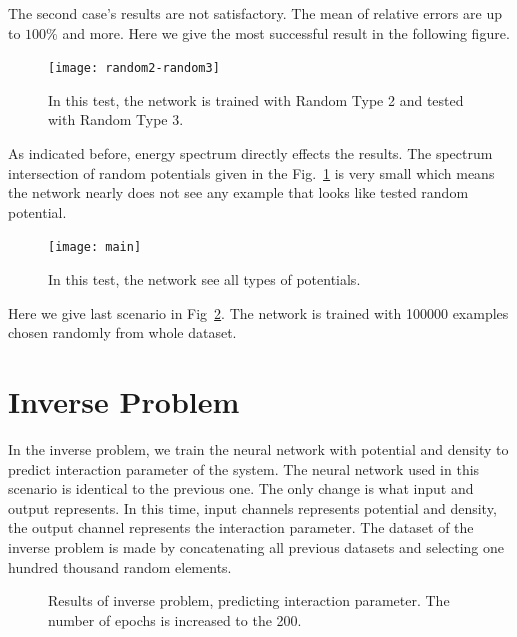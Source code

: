 \documentclass[a4paper,times,hidelinks,12pt]{article}
\begin{document}
The second case's results are not satisfactory. The mean of relative errors are up to $100\%$ and more. Here we give the most successful result in the following figure. 

\graphicspath{{"../figs/training/cross-training/"}}
\begin{figure}[H]
    \centering
    \texttt{[image: random2-random3]}
\caption{In this test, the network is trained with Random Type 2 and tested with Random Type 3.}
\label{fig:cross_training_results}
\end{figure}

As indicated before, energy spectrum directly effects the results. The spectrum intersection of random potentials given in the Fig.~\ref{fig:cross_training_results} is very small which means the network nearly does not see any example that looks like tested random potential.


\graphicspath{{"../figs/training/combined/"}}
\begin{figure}[H]
    \centering
    \texttt{[image: main]}
\caption{In this test, the network see all types of potentials.}
\label{fig:comb_training_results}
\end{figure}

Here we give last scenario in Fig~\ref{fig:comb_training_results}. The network is trained with 100000 examples chosen randomly from whole dataset.  



\section{Inverse Problem}

In the inverse problem, we train the neural network with potential and density to predict interaction parameter of the system. The neural network used in this scenario is identical to the previous one. The only change is what input and output represents. In this time, input channels represents potential and density, the output channel represents the interaction parameter. The dataset of the inverse problem is made by concatenating all previous datasets and selecting one hundred thousand random elements. 

\graphicspath{{"../figs/training/interaction/"}}
\begin{figure}[H]
    \centering
\caption{Results of inverse problem, predicting interaction parameter. The number of epochs is increased to the 200. }
\label{fig:inverse_results}
\end{figure}
\end{document}
